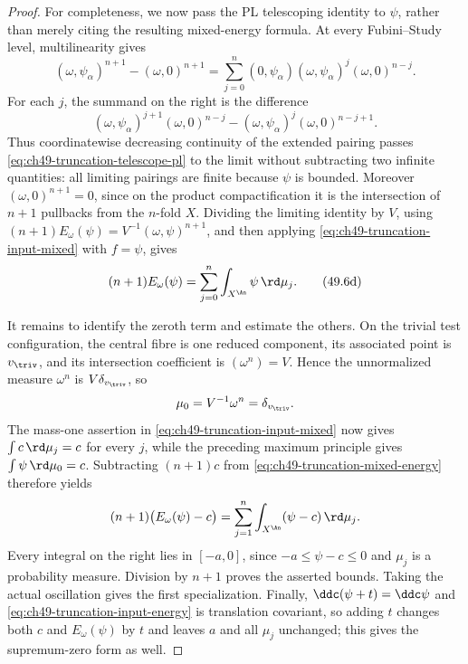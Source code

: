 \begin{proof}
For completeness, we now pass the PL telescoping identity to \(\psi\),
rather than merely citing the resulting mixed-energy formula.  At every
Fubini--Study level, multilinearity gives
\[
 (\omega,\psi_\alpha)^{n+1}-(\omega,0)^{n+1}
 =\sum_{j=0}^n
   (0,\psi_\alpha)(\omega,\psi_\alpha)^j(\omega,0)^{n-j}.
\tag{49.6c}\label{eq:ch49-truncation-telescope-pl}
\]
For each \(j\), the summand on the right is the difference
\[
 (\omega,\psi_\alpha)^{j+1}(\omega,0)^{n-j}
 -(\omega,\psi_\alpha)^j(\omega,0)^{n-j+1}.
\]
Thus coordinatewise decreasing continuity of the extended pairing passes
\eqref{eq:ch49-truncation-telescope-pl} to the limit without subtracting
two infinite quantities: all limiting pairings are finite because
\(\psi\) is bounded.  Moreover \((\omega,0)^{n+1}=0\), since on the
product compactification it is the intersection of \(n+1\) pullbacks from
the \(n\)-fold \(X\).  Dividing the limiting
identity by \(V\), using
\((n+1)E_\omega(\psi)=V^{-1}(\omega,\psi)^{n+1}\), and then applying
\eqref{eq:ch49-truncation-input-mixed} with \(f=\psi\), gives
\[
 (n+1)E_\omega(\psi)
 =\sum_{j=0}^n\int_{X^{\An}}\psi\,\rd\mu_j .
\tag{49.6d}\label{eq:ch49-truncation-mixed-energy}
\]

It remains to identify the zeroth term and estimate the others.  On the
trivial test configuration, the central fibre is one reduced component,
its associated point is \(v_{\triv}\), and its intersection coefficient
is \((\omega^n)=V\).  Hence the unnormalized measure \(\omega^n\) is
\(V\delta_{v_{\triv}}\), so
\[
                         \mu_0=V^{-1}\omega^n=\delta_{v_{\triv}}.
\]
The mass-one assertion in \eqref{eq:ch49-truncation-input-mixed} now gives
\(\int c\,\rd\mu_j=c\) for every \(j\), while the preceding maximum
principle gives \(\int\psi\,\rd\mu_0=c\).  Subtracting \((n+1)c\) from
\eqref{eq:ch49-truncation-mixed-energy} therefore yields
\[
 (n+1)\bigl(E_\omega(\psi)-c\bigr)
 =\sum_{j=1}^n\int_{X^{\An}}(\psi-c)\,\rd\mu_j.
\]
Every integral on the right lies in \([-a,0]\), since
\(-a\le\psi-c\le0\) and \(\mu_j\) is a probability measure.  Division
by \(n+1\) proves the asserted bounds.  Taking the actual oscillation gives
the first specialization.  Finally, \(\ddc(\psi+t)=\ddc\psi\) and
\eqref{eq:ch49-truncation-input-energy} is translation covariant, so
adding \(t\) changes both \(c\) and \(E_\omega(\psi)\) by \(t\) and
leaves \(a\) and all \(\mu_j\) unchanged; this gives the supremum-zero
form as well.
\end{proof}
